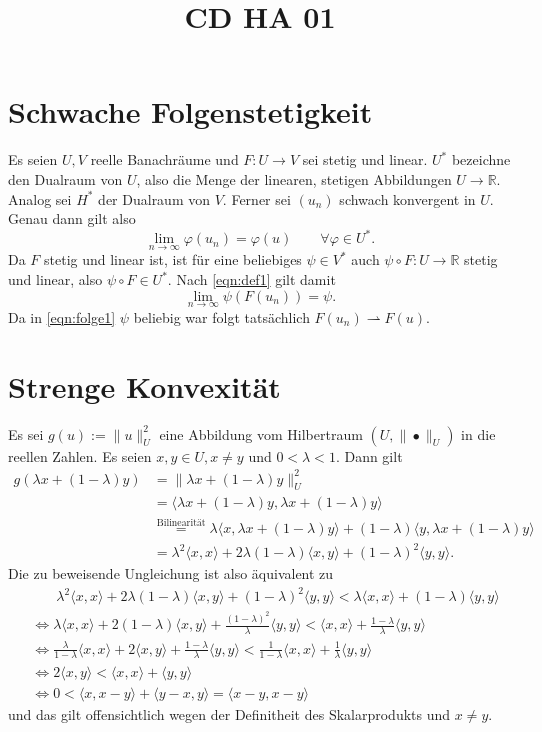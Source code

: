 \documentclass[a4paper]{article}
\title{CD HA 01}
\DeclareMathOperator{\wto}{\rightharpoonup}
\begin{document}
\section{Schwache Folgenstetigkeit}
Es seien $U,V$ reelle Banachräume und $F\colon U \to V$ sei stetig und linear.
$U^*$ bezeichne den Dualraum von $U$, also die Menge der linearen, stetigen Abbildungen $U \to ℝ$. 
Analog sei $H^*$ der Dualraum von $V$.
Ferner sei $(u_n)$ schwach konvergent in $U$. Genau dann gilt also
\begin{equation}
\label{eqn:def1}
\lim_{n\to ∞} φ(u_n) = φ(u) \qquad ∀φ\in U^*.
\end{equation}
Da $F$ stetig und linear ist, ist für eine beliebiges $ψ\in V^*$ auch $ψ\circ F : U \to ℝ$ stetig und linear, also $ψ\circ F \in U^*$. Nach \eqref{eqn:def1} gilt damit
\begin{equation}
\label{eqn:folge1}
\lim_{n\to ∞} ψ(F(u_n)) = ψ.
\end{equation}
Da in \eqref{eqn:folge1} $ψ$ beliebig war folgt tatsächlich $F(u_n) \wto F(u)$.

\section{Strenge Konvexität}
Es sei $g(u) := \| u\|^2_U$ eine Abbildung vom Hilbertraum $(U,\|•\|_U)$ in die reellen Zahlen. Es seien $x,y \in U, x\ne y$ und $0<λ<1$. Dann gilt
\begin{align*}
g(λ x + (1-λ)y) &= \| λx + (1-λ) y\|_U^2 \\
&= \langle λx + (1-λ) y, λx + (1-λ) y \rangle \\
&\stackrel{\text{Bilinearität}}= λ\langle x, λx + (1-λ) y \rangle + (1-λ) \langle y , λx + (1-λ) y \rangle \\
&= λ^2 \langle x, x \rangle + 2λ(1-λ) \langle x, y \rangle + (1-λ)^2 \langle y, y \rangle  .
\end{align*}
Die zu beweisende Ungleichung ist also äquivalent zu
\begin{align*}
&\phantom{⇔~} λ^2 \langle x, x \rangle + 2λ(1-λ) \langle x, y \rangle + (1-λ)^2 \langle y, y \rangle < λ \langle x, x\rangle + (1-λ)\langle y,y\rangle \\
&⇔ λ \langle x, x \rangle + 2(1-λ) \langle x, y \rangle + \frac{(1-λ)^2}{λ} \langle y, y\rangle < \langle x, x \rangle + \frac{1-λ}{λ} \langle y,y \rangle \\
&⇔\frac{λ}{1-λ} \langle x, x \rangle + 2 \langle x, y \rangle + \frac{1-λ}{λ}\langle y,y \rangle < \frac{1}{1-λ}\langle x,x \rangle + \frac{1}{λ} \langle y, y\rangle\\
&⇔2\langle x,y\rangle < \langle x, x \rangle + \langle y,y\rangle \\
&⇔0 < \langle x, x-y \rangle + \langle y-x, y \rangle = \langle x-y , x-y \rangle
\end{align*}
und das gilt offensichtlich wegen der Definitheit des Skalarprodukts und $x\ne y.$
\end{document}
